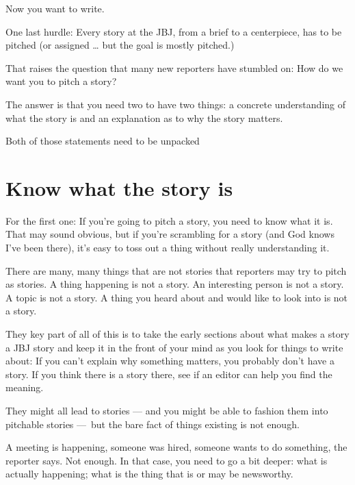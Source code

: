 \documentclass[
  11pt,
  american,
  letterpaperpaper,
  extrafontsizes,onecolumn,openright
  ]{memoir}
\begin{document}
Now you want to write.

One last hurdle: Every story at the JBJ, from a brief to a centerpiece, has to be pitched (or assigned \ldots{} but the goal is mostly pitched.)

That raises the question that many new reporters have stumbled on: How do we want you to pitch a story?

The answer is that you need two to have two things: a concrete understanding of what the story is and an explanation as to why the story matters.

Both of those statements need to be unpacked

\hypertarget{know-what-the-story-is}{%
\section*{Know what the story is}\label{know-what-the-story-is}}

For the first one: If you're going to pitch a story, you need to know what it is. That may sound obvious, but if you're scrambling for a story (and God knows I've been there), it's easy to toss out a thing without really understanding it.

There are many, many things that are not stories that reporters may try to pitch as stories. A thing happening is not a story. An interesting person is not a story. A topic is not a story. A thing you heard about and would like to look into is not a story.

\leavevmode{}%
\begin{greybox}[frametitle=Onboarding Path]
They key part of all of this is to take the early sections about what makes a story a JBJ story and keep it in the front of your mind as you look for things to write about: If you can't explain why something matters, you probably don't have a story. If you think there is a story there, see if an editor can help you find the meaning.

\end{greybox}

They might all lead to stories --- and you might be able to fashion them into pitchable stories ---~but the bare fact of things existing is not enough.

A meeting is happening, someone was hired, someone wants to do something, the reporter says. Not enough. In that case, you need to go a bit deeper: what is actually happening; what is the thing that is or may be newsworthy.
\end{document}
